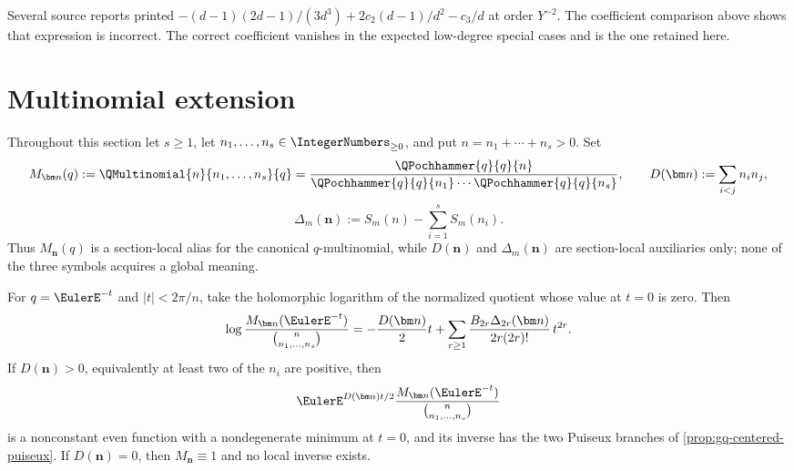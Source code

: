 \begin{remark}
Several source reports printed
\(-{(d-1)(2d-1)}/{(3d^3)}
+{2c_2(d-1)}/{d^2}-{c_3}/{d}\) at order \(Y^{-2}\).
The coefficient comparison above shows that expression is incorrect.  The
correct coefficient vanishes in the expected low-degree special cases and is
the one retained here.
\end{remark}

\section{Multinomial extension}
\label{sec:qmultinomial}

Throughout this section let \(s\ge1\), let
\(n_1,\ldots,n_s\in\IntegerNumbers_{\ge0}\), and put
\(n=n_1+\cdots+n_s>0\).  Set
\[
  M_{\bm n}(q)
  :=\QMultinomial{n}{n_1,\ldots,n_s}{q}
  =\frac{\QPochhammer{q}{q}{n}}
  {\QPochhammer{q}{q}{n_1}\cdots\QPochhammer{q}{q}{n_s}},
  \qquad
  D(\bm n):=\sum_{i<j}n_in_j,
\]
\[
  \Delta_m(\bm n)
  :=S_m(n)-\sum_{i=1}^{s}S_m(n_i).
\]
Thus $M_{\bm n}(q)$ is a section-local alias for the canonical
$q$-multinomial, while $D(\bm n)$ and $\Delta_m(\bm n)$ are section-local
auxiliaries only; none of the three symbols acquires a global meaning.

\begin{theorem}
\label{thm:qm-one-log}
For \(q=\EulerE^{-t}\) and \(|t|<2\pi/n\), take the holomorphic logarithm
of the normalized quotient whose value at \(t=0\) is zero.  Then
\[
  \log\frac{M_{\bm n}(\EulerE^{-t})}
                {\binom{n}{n_1,\ldots,n_s}}
  =-\frac{D(\bm n)}2t+
   \sum_{r\ge1}
   \frac{B_{2r}\Delta_{2r}(\bm n)}
        {2r(2r)!}\,t^{2r}.
\]
If \(D(\bm n)>0\), equivalently at least two of the \(n_i\) are positive,
then
\[
 \EulerE^{D(\bm n)t/2}
 \frac{M_{\bm n}(\EulerE^{-t})}{\binom{n}{n_1,\ldots,n_s}}
\]
is a nonconstant even function with a nondegenerate minimum at \(t=0\), and
its inverse has the two Puiseux branches of
\cref{prop:gq-centered-puiseux}.  If \(D(\bm n)=0\), then
\(M_{\bm n}\equiv1\) and no local inverse exists.
\end{theorem}

